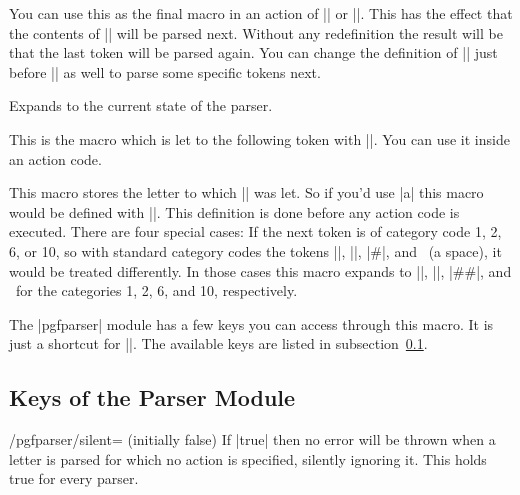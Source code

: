 \begin{command}{\pgfparserreinsert}%
  You can use this as the final macro in an action of |\pgfparserdef| or
  |\pgfparserdefunknown|. This has the effect that the contents of
  |\pgfparserletter| will be parsed next. Without any redefinition the result
  will be that the last token will be parsed again. You can change the
  definition of |\pgfparserletter| just before |\pgfparserreinsert| as well to
  parse some specific tokens next.
\end{command}%

\begin{command}{\pgfparserstate}%
  Expands to the current state of the parser.
\end{command}%

\begin{command}{\pgfparsertoken}%
  This is the macro which is let to the following token with |\futurelet|. You
  can use it inside an action code.
\end{command}%

\begin{command}{\pgfparserletter}%
  This macro stores the letter to which |\pgfparsertoken| was let. So if
  you'd use |a| this macro would be defined with
  |\def\pgfparserletter{a}|. This definition is done before any action code is
  executed. There are four special cases: If the next token is of category code
  1, 2, 6, or 10, so with standard category codes the tokens |{|, |}|, |#|, and
  \textvisiblespace\ (a space), it would be treated differently. In those cases
  this macro expands to |\bgroup|, |\egroup|, |##|, and \textvisiblespace\ for
  the categories 1, 2, 6, and 10, respectively.
\end{command}%

\begin{command}{\pgfparserset{}}%
  The |pgfparser| module has a few keys you can access through this macro. It
  is just a shortcut for ||. The available keys are
  listed in subsection~\ref{sec:parser:keys}.
\end{command}%


\subsection{Keys of the Parser Module}
\label{sec:parser:keys}

\begin{key}{/pgfparser/silent= (initially false)}%
  If |true| then no error will be thrown when a letter is parsed for which no
  action is specified, silently ignoring it. This holds true for every parser.
\end{key}%

